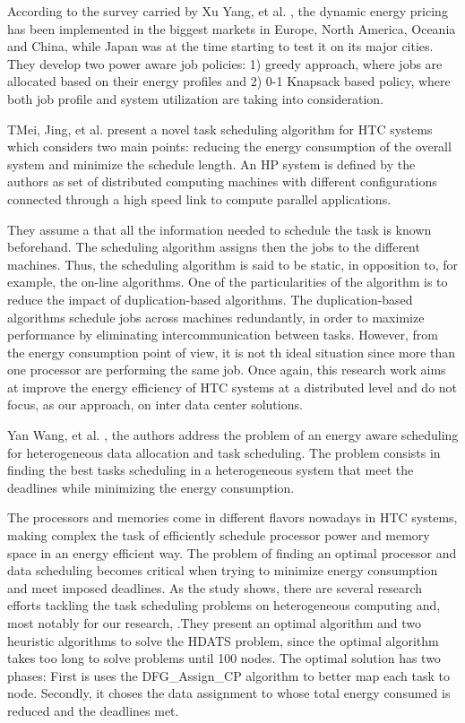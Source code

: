 According to the survey carried by Xu Yang, et al. \cite{DYN_PRICING_HPC}, the dynamic energy
pricing has been implemented in the biggest markets in Europe, North America,
Oceania and China, while Japan was at the time starting to test it on its major
cities. They develop two power aware job policies: 1) greedy approach, where jobs are
allocated based on their energy profiles  and 2) 0-1 Knapsack based policy,
where both job profile and system utilization are taking into consideration.

TMei, Jing, et al. \cite{SCHED_HETEROGE} present a novel task scheduling algorithm
for HTC systems which considers two main points: reducing the energy consumption
of the overall system and minimize the schedule length. An HP system is defined
by the authors as set of distributed computing machines with different
configurations connected through a high speed link to compute parallel
applications.

They assume a that all the information needed to schedule the task is known
beforehand. The scheduling algorithm assigns then the jobs to the different
machines. Thus, the scheduling algorithm is said to be static, in opposition to,
for example, the on-line algorithms.  One of the particularities of the algorithm is to reduce the impact of
duplication-based algorithms. The duplication-based algorithms schedule jobs
across machines redundantly, in order to maximize performance by eliminating
intercommunication between tasks. However, from the energy consumption point of
view, it is not th ideal situation since more than one processor are performing
the same job. Once again, this research work aims at improve the energy efficiency of HTC
systems at a distributed level and do not focus, as our approach, on inter data
center solutions.

 Yan Wang, et al. \cite{TASK_SCHED}, the authors address the problem of an energy aware
scheduling for heterogeneous data allocation and task scheduling. The problem
consists in finding the best tasks scheduling in a heterogeneous system that meet
the deadlines while minimizing the energy consumption.

The processors and memories come in different flavors nowadays in HTC
systems, making complex the task of efficiently schedule processor power and 
memory space in an energy efficient way. The problem of finding an optimal
processor and data scheduling becomes critical when trying to minimize energy 
consumption and meet imposed deadlines. As the study shows, there are several research efforts tackling the task
scheduling problems on heterogeneous computing and, most notably for our
research, \cite{EFF_DSP}.They present an optimal algorithm and two heuristic algorithms to solve the
HDATS problem, since the optimal algorithm takes too long to solve problems
until 100 nodes. The optimal solution has two phases: First is uses the
DFG\_Assign\_CP algorithm to better map each task to node. Secondly, it choses the
data assignment to whose total energy consumed is reduced and the deadlines met.

